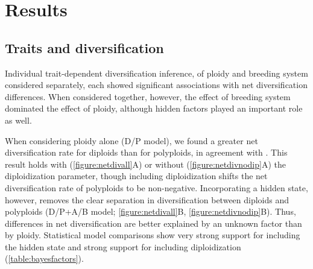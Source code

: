 \section{Results}

\subsection{Traits and diversification}



Individual trait-dependent diversification inference, of ploidy and breeding system considered separately, each showed significant associations with net diversification differences. 
When considered together, however, the effect of breeding system dominated the effect of ploidy, although hidden factors played an important role as well.

When considering ploidy alone (D/P model), we found a greater net diversification rate for diploids than for polyploids, in agreement with \citep{mayrose_2011, mayrose_2015}.
This result holds with (\cref{figure:netdivall}A) or without (\cref{figure:netdivnodip}A) the diploidization parameter, though including diploidization shifts the net diversification rate of polyploids to be non-negative.
Incorporating a hidden state, however, removes the clear separation in diversification between diploids and polyploids (D/P+A/B model; \cref{figure:netdivall}B, \cref{figure:netdivnodip}B).
Thus, differences in net diversification are better explained by an unknown factor than by ploidy.
Statistical model comparisons show very strong support for including the hidden state and strong support for including diploidization (\cref{table:bayesfactors}).

